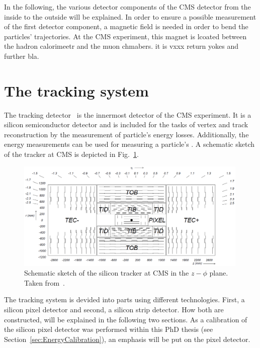 In the following, the various detector components of the CMS detector from the inside to the outside will be explained.
In order to ensure a possible measurement of the first detector component, a magnetic field is needed in order to bend the particles' trajectories.
At the CMS experiment, this magnet is lcoated between the hadron calorimeetr and the muon chmabers.
it is vxxx return yokes and further bla.


\FloatBarrier
\section{The tracking system}

The tracking detector~\cite{bib:CMS:Tracker_1997,bib:CMS:Tracker_2000} is the innermost detector of the CMS experiment. 
It is a silicon semiconductor detector and is included for the tasks of vertex and track reconstruction by the measurement of particle's energy losses.
Additionally, the energy measurements can be used for measuring a particle's \dedx.
A schematic sketch of the tracker at CMS is depicted in Fig.~\ref{fig:Tracker}.
\begin{figure}[!b]
  \centering
      \includegraphics[width=0.99\textwidth]{figures/experiment/CMS/Figures_Experimental_Apparatus_Tracker.png}
  \caption{Schematic sketch of the silicon tracker at CMS in the $z - \phi$ plane. Taken from~\cite{bib:CMS:tracking_8TeV}.}  
  \label{fig:Tracker}
\end{figure}
The tracking system is devided into parts using different technologies. First, a silicon pixel detector and second, a silicon strip detector.
How both are constructed, will be explained in the following two sections.
As a calibration of the silicon pixel detector was performed within this PhD thesis (see Section~\ref{sec:EnergyCalibration}), an emphasis will be put on the pixel detector.

